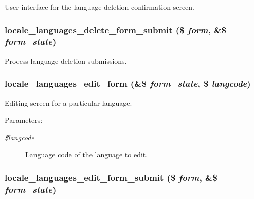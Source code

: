User interface for the language deletion confirmation screen. \hypertarget{group__locale_gdbf1eb80de38d65bda55e63699822e3c}{
\subsubsection[{locale\_\-languages\_\-delete\_\-form\_\-submit}]{\setlength{\rightskip}{0pt plus 5cm}locale\_\-languages\_\-delete\_\-form\_\-submit (\$ {\em form}, \/  \&\$ {\em form\_\-state})}}
\label{group__locale_gdbf1eb80de38d65bda55e63699822e3c}


Process language deletion submissions. \hypertarget{group__locale_g7509cf7dde8125ba91c2f93d7a42ded1}{
\subsubsection[{locale\_\-languages\_\-edit\_\-form}]{\setlength{\rightskip}{0pt plus 5cm}locale\_\-languages\_\-edit\_\-form (\&\$ {\em form\_\-state}, \/  \$ {\em langcode})}}
\label{group__locale_g7509cf7dde8125ba91c2f93d7a42ded1}


Editing screen for a particular language.

\begin{Desc}
\item[Parameters:]
\begin{description}
\item[{\em \$langcode}]Language code of the language to edit. \end{description}
\end{Desc}
\hypertarget{group__locale_g749200a912dbb5d31c5403d3fd909741}{
\subsubsection[{locale\_\-languages\_\-edit\_\-form\_\-submit}]{\setlength{\rightskip}{0pt plus 5cm}locale\_\-languages\_\-edit\_\-form\_\-submit (\$ {\em form}, \/  \&\$ {\em form\_\-state})}}
\label{group__locale_g749200a912dbb5d31c5403d3fd909741}


